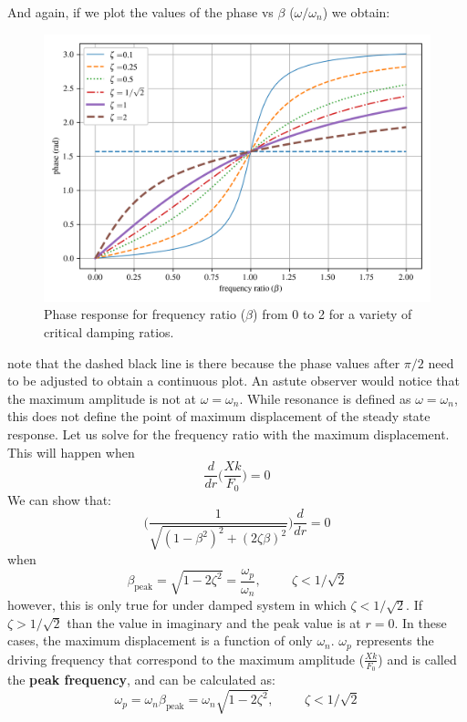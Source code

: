 \documentclass[12pt,letter]{article}
\numberwithin{ex}{section} %
\numberwithin{re}{section} %
\begin{document}
			\noindent And again, if we plot the values of the phase vs $\beta$ ($\omega/\omega_n$) we obtain:
			\begin{figure}[H]
				\centering
				\includegraphics[]{../Figures/underdamped_frequency_response_phase.png}
				\caption{Phase response for frequency ratio ($\beta$) from 0 to 2 for a variety of critical damping ratios.}
			\end{figure}				
			\noindent note that the dashed black line is there because the phase values after $\pi/2$ need to be adjusted to obtain a continuous plot. An astute observer would notice that the maximum amplitude is not at $\omega = \omega_n$. While resonance is defined as $\omega = \omega_n$, this does not define the point of maximum displacement of the steady state response. Let us solve for the frequency ratio with the maximum displacement. This will happen when
			\begin{equation}
				\frac{d}{dr}\Bigg(\frac{Xk}{F_0} \Bigg)= 0
			\end{equation}				
			We can show that:
			\begin{equation}
			\Bigg(\frac{1}{\sqrt{(1-\beta^2)^2+(2\zeta \beta)^2}}\Bigg)	\frac{d}{dr} =0
			\end{equation}	
			when 
			\begin{equation}
			\beta_{\text{peak}} = \sqrt{1-2 \zeta^2}= \frac{\omega_p}{\omega_n}, \hspace{1cm} \zeta<1/\sqrt{2} 
			\end{equation}				
			however, this is only true for under damped system in which $\zeta<1/\sqrt{2}$. If $\zeta>1/\sqrt{2}$ than the value in imaginary and the peak value is at $r=0$. In these cases, the maximum displacement is a function of only $\omega_n$. $\omega_p$ represents the driving frequency that correspond to the maximum amplitude ($\frac{Xk}{F_0}$) and is called the \textbf{peak frequency}, and can be calculated as:
			\begin{equation}
			\omega_p = \omega_n \beta_{\text{peak}} = \omega_n \sqrt{1-2 \zeta^2}, \hspace{1cm} \zeta<1/\sqrt{2} 
			\end{equation}				
			
\end{document}

